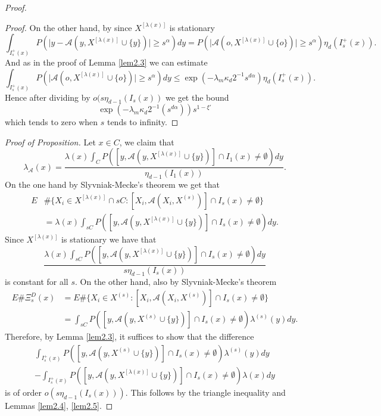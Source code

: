 \begin{proof}
\begin{proof}
On the other hand, by since $X^{[\lambda (x)]}$ is stationary
\small $$\int_{I^+_s(x)}P(\vert y-\mathcal{A}(y, X^{[\lambda(x)]}\cup\lbrace y\rbrace)\vert\geq s^{\alpha}) dy=P(\vert\mathcal{A}(o, X^{[\lambda(x)]}\cup\lbrace o\rbrace)\vert\geq s^{\alpha})\eta_d(I^+_s(x)).$$
\normalsize
And as in the proof of Lemma \ref{lem2.3} we can estimate 
$$\int_{I^+_s(x)}P(\vert\mathcal{A}(o, X^{[\lambda(x)]}\cup\lbrace o\rbrace)\vert\geq s^{\alpha})dy\leq\exp(-\lambda_m\kappa_d2^{-1}s^{d\alpha})\eta_{d}(I^+_s(x)).$$ Hence after dividing by $o(s\eta_{d-1}(I_s(x))$ we get the bound $$\exp(-\lambda_m\kappa_d2^{-1}(s^{d\alpha}))s^{1-\xi'} $$ which tends to zero when $s$ tends to infinity.
\end{proof}
\textit{Proof of Proposition.}
Let $x\in C$, we claim that 
$$\lambda_{\mathcal{A}}(x)=\frac{\lambda (x)\int_{C}P([y, \mathcal{A}(y, X^{[\lambda(x)]}\cup\lbrace y\rbrace)]\cap I_1(x)\neq\emptyset)dy}{\eta_{d-1}(I_1(x))}. $$ 
On the one hand by Slyvniak-Mecke's theorem we get that
\begin{align}
E&\#\lbrace X_i\in X^{[\lambda (x)]}\cap sC: [X_i, \mathcal{A}(X_i, X^{(s)})]\cap I_s(x)\neq\emptyset\rbrace\nonumber\\
&=\lambda(x)\int_{sC}P([y, \mathcal{A}(y, X^{[\lambda (x)]}\cup\lbrace y\rbrace)]\cap I_s(x)\neq\emptyset)dy\nonumber.
\end{align}
Since $X^{[\lambda (x)]}$ is stationary we have that $$\frac{\lambda (x)\int_{sC}P([y, \mathcal{A}(y, X^{[\lambda(x)]}\cup\lbrace y\rbrace)]\cap I_s(x)\neq\emptyset)dy}{s\eta_{d-1}(I_s(x))}$$ is constant for all $s$.
On the other hand, also by Slyvniak-Mecke's theorem
\begin{align}
E\#\Xi_s^D(x) &=E\#\lbrace X_i\in X^{(s)}: [X_i, \mathcal{A}(X_i, X^{(s)})]\cap I_s(x)\neq\emptyset\rbrace\nonumber\\
&=\int_{sC}P([y, \mathcal{A}(y, X^{(s)}\cup\lbrace y\rbrace)]\cap I_s(x)\neq\emptyset)\lambda^{(s)}(y)dy\nonumber.
\end{align}
Therefore, by Lemma \ref{lem2.3}, it suffices to show that the difference
\begin{align}
\int_{I^+_s(x)} P([y, \mathcal{A}(y,X^{(s)}\cup\lbrace y\rbrace)]\cap I_s(x)\neq \emptyset)\lambda^{(s)}(y)dy\nonumber\\
-\int_{I^+_s(x)} P([y, \mathcal{A}(y,X^{[\lambda(x)]}\cup\lbrace y\rbrace)]\cap I_s(x)\neq \emptyset)\lambda(x)dy\nonumber
\end{align}
is of order $o(s\eta_{d-1}(I_s(x)))$. This follows by the triangle inequality and Lemmas \ref{lem2.4}, \ref{lem2.5}.
\end{proof}

